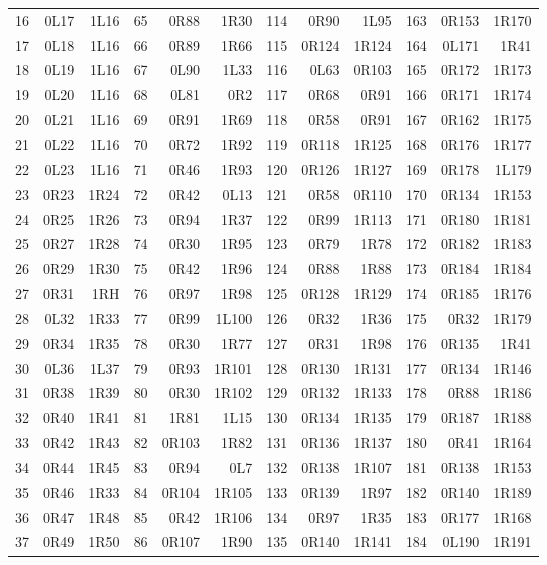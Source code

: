 \begin{center}
\begin{tabular}{rrr@{\hspace{7mm}}rrr@{\hspace{7mm}}rrr@{\hspace{7mm}}rrr}
16 & 0L17 & 1L16 & 65 & 0R88 & 1R30 & 114 & 0R90 & 1L95 & 163 & 0R153 & 1R170 \\
17 & 0L18 & 1L16 & 66 & 0R89 & 1R66 & 115 & 0R124 & 1R124 & 164 & 0L171 & 1R41 \\
18 & 0L19 & 1L16 & 67 & 0L90 & 1L33 & 116 & 0L63 & 0R103 & 165 & 0R172 & 1R173 \\
19 & 0L20 & 1L16 & 68 & 0L81 & 0R2 & 117 & 0R68 & 0R91 & 166 & 0R171 & 1R174 \\
20 & 0L21 & 1L16 & 69 & 0R91 & 1R69 & 118 & 0R58 & 0R91 & 167 & 0R162 & 1R175 \\
21 & 0L22 & 1L16 & 70 & 0R72 & 1R92 & 119 & 0R118 & 1R125 & 168 & 0R176 & 1R177 \\
22 & 0L23 & 1L16 & 71 & 0R46 & 1R93 & 120 & 0R126 & 1R127 & 169 & 0R178 & 1L179 \\
23 & 0R23 & 1R24 & 72 & 0R42 & 0L13 & 121 & 0R58 & 0R110 & 170 & 0R134 & 1R153 \\
24 & 0R25 & 1R26 & 73 & 0R94 & 1R37 & 122 & 0R99 & 1R113 & 171 & 0R180 & 1R181 \\
25 & 0R27 & 1R28 & 74 & 0R30 & 1R95 & 123 & 0R79 & 1R78 & 172 & 0R182 & 1R183 \\
26 & 0R29 & 1R30 & 75 & 0R42 & 1R96 & 124 & 0R88 & 1R88 & 173 & 0R184 & 1R184 \\
27 & 0R31 & 1RH & 76 & 0R97 & 1R98 & 125 & 0R128 & 1R129 & 174 & 0R185 & 1R176 \\
28 & 0L32 & 1R33 & 77 & 0R99 & 1L100 & 126 & 0R32 & 1R36 & 175 & 0R32 & 1R179 \\
29 & 0R34 & 1R35 & 78 & 0R30 & 1R77 & 127 & 0R31 & 1R98 & 176 & 0R135 & 1R41 \\
30 & 0L36 & 1L37 & 79 & 0R93 & 1R101 & 128 & 0R130 & 1R131 & 177 & 0R134 & 1R146 \\
31 & 0R38 & 1R39 & 80 & 0R30 & 1R102 & 129 & 0R132 & 1R133 & 178 & 0R88 & 1R186 \\
32 & 0R40 & 1R41 & 81 & 1R81 & 1L15 & 130 & 0R134 & 1R135 & 179 & 0R187 & 1R188 \\
33 & 0R42 & 1R43 & 82 & 0R103 & 1R82 & 131 & 0R136 & 1R137 & 180 & 0R41 & 1R164 \\
34 & 0R44 & 1R45 & 83 & 0R94 & 0L7 & 132 & 0R138 & 1R107 & 181 & 0R138 & 1R153 \\
35 & 0R46 & 1R33 & 84 & 0R104 & 1R105 & 133 & 0R139 & 1R97 & 182 & 0R140 & 1R189 \\
36 & 0R47 & 1R48 & 85 & 0R42 & 1R106 & 134 & 0R97 & 1R35 & 183 & 0R177 & 1R168 \\
37 & 0R49 & 1R50 & 86 & 0R107 & 1R90 & 135 & 0R140 & 1R141 & 184 & 0L190 & 1R191 \\

\end{tabular}
\end{center}
